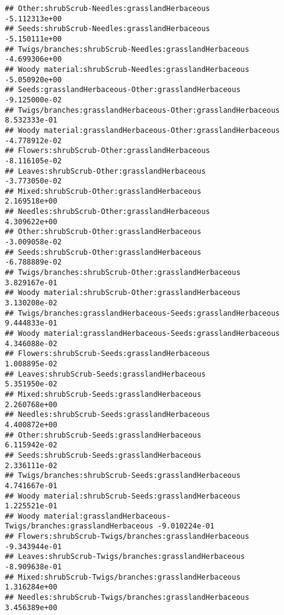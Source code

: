 \documentclass[
]{article}
\begin{document}
\begin{verbatim}
## Other:shrubScrub-Needles:grasslandHerbaceous                          -5.112313e+00
## Seeds:shrubScrub-Needles:grasslandHerbaceous                          -5.150111e+00
## Twigs/branches:shrubScrub-Needles:grasslandHerbaceous                 -4.699306e+00
## Woody material:shrubScrub-Needles:grasslandHerbaceous                 -5.050920e+00
## Seeds:grasslandHerbaceous-Other:grasslandHerbaceous                   -9.125000e-02
## Twigs/branches:grasslandHerbaceous-Other:grasslandHerbaceous           8.532333e-01
## Woody material:grasslandHerbaceous-Other:grasslandHerbaceous          -4.778912e-02
## Flowers:shrubScrub-Other:grasslandHerbaceous                          -8.116105e-02
## Leaves:shrubScrub-Other:grasslandHerbaceous                           -3.773050e-02
## Mixed:shrubScrub-Other:grasslandHerbaceous                             2.169518e+00
## Needles:shrubScrub-Other:grasslandHerbaceous                           4.309622e+00
## Other:shrubScrub-Other:grasslandHerbaceous                            -3.009058e-02
## Seeds:shrubScrub-Other:grasslandHerbaceous                            -6.788889e-02
## Twigs/branches:shrubScrub-Other:grasslandHerbaceous                    3.829167e-01
## Woody material:shrubScrub-Other:grasslandHerbaceous                    3.130208e-02
## Twigs/branches:grasslandHerbaceous-Seeds:grasslandHerbaceous           9.444833e-01
## Woody material:grasslandHerbaceous-Seeds:grasslandHerbaceous           4.346088e-02
## Flowers:shrubScrub-Seeds:grasslandHerbaceous                           1.008895e-02
## Leaves:shrubScrub-Seeds:grasslandHerbaceous                            5.351950e-02
## Mixed:shrubScrub-Seeds:grasslandHerbaceous                             2.260768e+00
## Needles:shrubScrub-Seeds:grasslandHerbaceous                           4.400872e+00
## Other:shrubScrub-Seeds:grasslandHerbaceous                             6.115942e-02
## Seeds:shrubScrub-Seeds:grasslandHerbaceous                             2.336111e-02
## Twigs/branches:shrubScrub-Seeds:grasslandHerbaceous                    4.741667e-01
## Woody material:shrubScrub-Seeds:grasslandHerbaceous                    1.225521e-01
## Woody material:grasslandHerbaceous-Twigs/branches:grasslandHerbaceous -9.010224e-01
## Flowers:shrubScrub-Twigs/branches:grasslandHerbaceous                 -9.343944e-01
## Leaves:shrubScrub-Twigs/branches:grasslandHerbaceous                  -8.909638e-01
## Mixed:shrubScrub-Twigs/branches:grasslandHerbaceous                    1.316284e+00
## Needles:shrubScrub-Twigs/branches:grasslandHerbaceous                  3.456389e+00

\end{verbatim}
\end{document}
